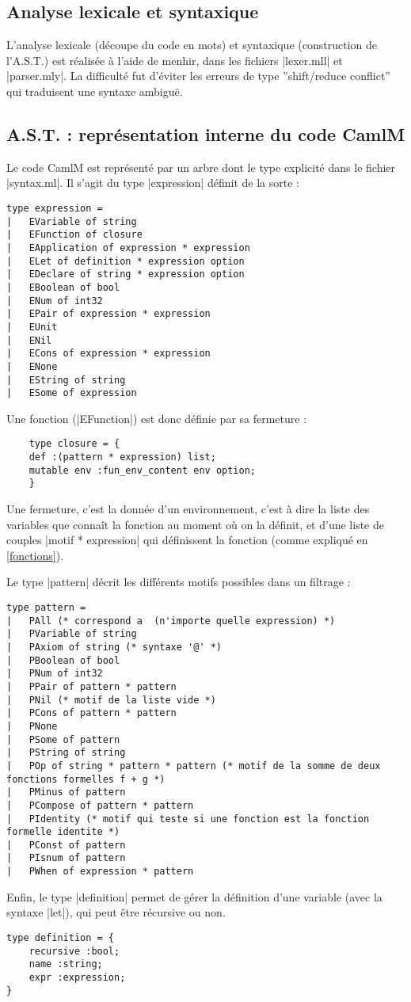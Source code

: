 \documentclass[a4paper, 12pt]{article}
\begin{document}
	\subsection{Analyse lexicale et syntaxique}
	
	L'analyse lexicale (découpe du code en mots) et syntaxique (construction de l'A.S.T.) est réalisée à l'aide de menhir, dans les fichiers |lexer.mll| et |parser.mly|.
	La difficulté fut d'éviter les erreurs de type ''shift/reduce conflict'' qui traduisent une syntaxe ambiguë.
	
	\subsection{A.S.T. : représentation interne du code CamlM}
	
	Le code CamlM est représenté par un arbre dont le type explicité dans le fichier |syntax.ml|.
	Il s'agit du type |expression| définit de la sorte : 
	\begin{lstlisting}
type expression = 
| 	EVariable of string
| 	EFunction of closure
| 	EApplication of expression * expression
| 	ELet of definition * expression option
| 	EDeclare of string * expression option
| 	EBoolean of bool
| 	ENum of int32
| 	EPair of expression * expression
| 	EUnit
| 	ENil
| 	ECons of expression * expression
| 	ENone
| 	EString of string
| 	ESome of expression
	\end{lstlisting}
	
	Une fonction (|EFunction|) est donc définie par sa fermeture : 
\begin{lstlisting}
	type closure = {
   	def :(pattern * expression) list;
   	mutable env :fun_env_content env option;
    } 
\end{lstlisting}
	Une fermeture, c'est la donnée d'un environnement, c'est à dire la liste des variables que connaît la fonction au moment où on la définit, et d'une liste de couples |motif * expression| qui définissent la fonction (comme expliqué en \ref{fonctions}).
	
	Le type |pattern| décrit les différents motifs possibles dans un filtrage : 
\begin{lstlisting}
type pattern = 
| 	PAll (* correspond a  (n'importe quelle expression) *)
| 	PVariable of string
| 	PAxiom of string (* syntaxe '@' *)
| 	PBoolean of bool
| 	PNum of int32
| 	PPair of pattern * pattern
| 	PNil (* motif de la liste vide *)
| 	PCons of pattern * pattern
| 	PNone
| 	PSome of pattern
| 	PString of string
| 	POp of string * pattern * pattern (* motif de la somme de deux fonctions formelles f + g *)
| 	PMinus of pattern
| 	PCompose of pattern * pattern
| 	PIdentity (* motif qui teste si une fonction est la fonction formelle identite *)
| 	PConst of pattern
| 	PIsnum of pattern
| 	PWhen of expression * pattern
\end{lstlisting}
Enfin, le type |definition| permet de gérer la définition d'une variable (avec la syntaxe |let|), qui peut être récursive ou non.
\begin{lstlisting}
type definition = {
   	recursive :bool;
   	name :string;
   	expr :expression;
} 
\end{lstlisting}
\end{document}
